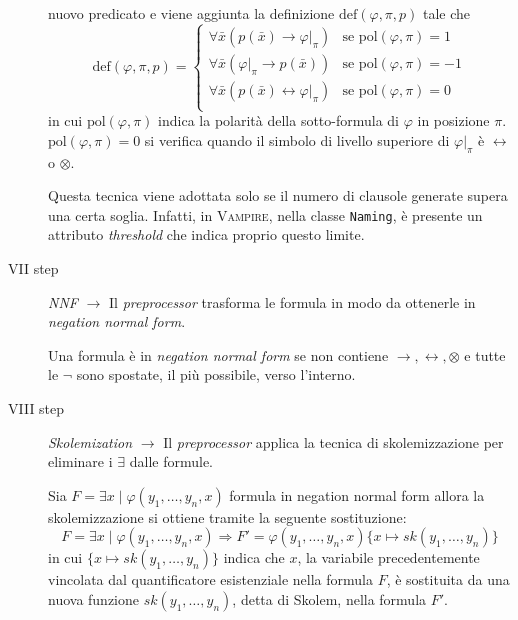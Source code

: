 \begin{description}
\begin{definition}
        nuovo predicato e viene aggiunta la definizione $\text{def}(\varphi,\pi,p)$ tale che
        \[\text{def}(\varphi,\pi,p)=\begin{cases}
            \forall \bar{x} (p(\bar{x})\rightarrow \varphi|_\pi) & \text{se pol}(\varphi,\pi)=1\\
            \forall \bar{x} (\varphi|_\pi\rightarrow p(\bar{x})) & \text{se pol}(\varphi,\pi)=-1\\
            \forall \bar{x} (p(\bar{x})\leftrightarrow \varphi|_\pi) & \text{se pol}(\varphi,\pi)=0\\
        \end{cases}\]
        in cui $\text{pol}(\varphi,\pi)$ indica la polarità della sotto-formula di $\varphi$ in posizione $\pi$. $\text{pol}(\varphi,\pi)=0$ si verifica quando il simbolo di livello superiore di $\varphi|_\pi$ è 
        $\leftrightarrow$ o $\otimes$.   
    \end{definition}
    \begin{remark}
        Questa tecnica viene adottata solo se il numero di clausole generate supera una certa soglia. Infatti, in 
        \textsc{Vampire}, nella classe \verb|Naming|, è presente un attributo \emph{threshold} che indica proprio questo limite.
    \end{remark}
    \item[VII step] \emph{NNF} $\longrightarrow$ Il \emph{preprocessor} trasforma le formula in modo da ottenerle in \emph{negation normal form}.
    \begin{definition}
        Una formula è in \emph{negation normal form} se non contiene $\rightarrow,\leftrightarrow,\otimes$ e tutte le $\neg$ sono spostate, il più possibile, verso l'interno.
    \end{definition}
    \item[VIII step] \emph{Skolemization} $\longrightarrow$ Il \emph{preprocessor} applica la tecnica di skolemizzazione per eliminare i $\exists$ dalle formule.
    \begin{definition}
        Sia $F=\exists x\mid\varphi(y_1,\dots,y_n,x)$ formula in negation normal form allora la skolemizzazione si ottiene tramite la seguente sostituzione:
        \[F=\exists x\mid\varphi(y_1,\dots,y_n,x)\Rightarrow F'=\varphi(y_1,\dots,y_n,x)\{x \mapsto sk(y_1,\dots,y_n)\}\]
        in cui $\{x \mapsto sk(y_1,\dots,y_n)\}$ indica che $x$, la variabile precedentemente vincolata dal quantificatore esistenziale nella formula $F$, 
        è sostituita da una nuova funzione $sk(y_1,\dots,y_n)$, detta di Skolem, nella formula $F'$.

\end{definition}
\end{description}
